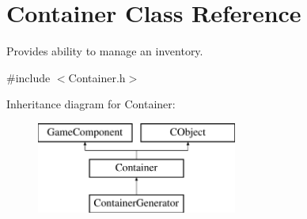 \hypertarget{class_container}{}\section{Container Class Reference}
\label{class_container}


Provides ability to manage an inventory.  




{\ttfamily \#include $<$Container.\+h$>$}

Inheritance diagram for Container\+:\begin{figure}[H]
\begin{center}
\leavevmode
\includegraphics[height=3.000000cm]{class_container}
\end{center}
\end{figure}
